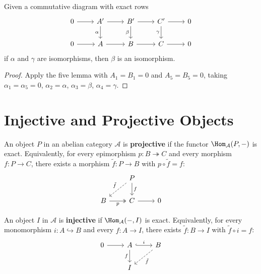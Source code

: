 \begin{corollary}\label{cor:short-five-lemma}
Given a commutative diagram with exact rows
\[
\begin{tikzcd}
    0 \arrow[r] & A' \arrow[r] \arrow[d, "\alpha"'] & B' \arrow[r] \arrow[d, "\beta"'] & C' \arrow[r] \arrow[d, "\gamma"'] & 0 \\
    0 \arrow[r] & A \arrow[r] & B \arrow[r] & C \arrow[r] & 0
\end{tikzcd}
\]
if $\alpha$ and $\gamma$ are isomorphisms, then $\beta$ is an isomorphism.
\end{corollary}

\begin{proof}
Apply the five lemma with $A_1 = B_1 = 0$ and $A_5 = B_5 = 0$, taking
$\alpha_1 = \alpha_5 = 0$, $\alpha_2 = \alpha$, $\alpha_3 = \beta$, $\alpha_4 = \gamma$.
\end{proof}


\section{Injective and Projective Objects}\label{sec:inj-proj}

\begin{definition}\label{def:projective}
An object $P$ in an abelian category $\mathcal{A}$ is \textbf{projective} if the
functor $\Hom_{\mathcal{A}}(P, -)$ is exact. Equivalently, for every epimorphism
$p \colon B \twoheadrightarrow C$ and every morphism $f \colon P \to C$, there exists
a morphism $\tilde{f} \colon P \to B$ with $p \circ \tilde{f} = f$:
\[
\begin{tikzcd}
    & P \arrow[d, "f"] \arrow[dl, dashed, "\tilde{f}"'] \\
    B \arrow[r, "p"', twoheadrightarrow] & C \arrow[r] & 0
\end{tikzcd}
\]
\end{definition}

\begin{definition}\label{def:injective}
An object $I$ in $\mathcal{A}$ is \textbf{injective} if $\Hom_{\mathcal{A}}(-, I)$ is exact.
Equivalently, for every monomorphism $i \colon A \hookrightarrow B$ and every
$f \colon A \to I$, there exists $\tilde{f} \colon B \to I$ with $\tilde{f} \circ i = f$:
\[
\begin{tikzcd}
    0 \arrow[r] & A \arrow[r, hookrightarrow, "i"] \arrow[d, "f"'] & B \arrow[dl, dashed, "\tilde{f}"] \\
    & I &
\end{tikzcd}
\]
\end{definition}

